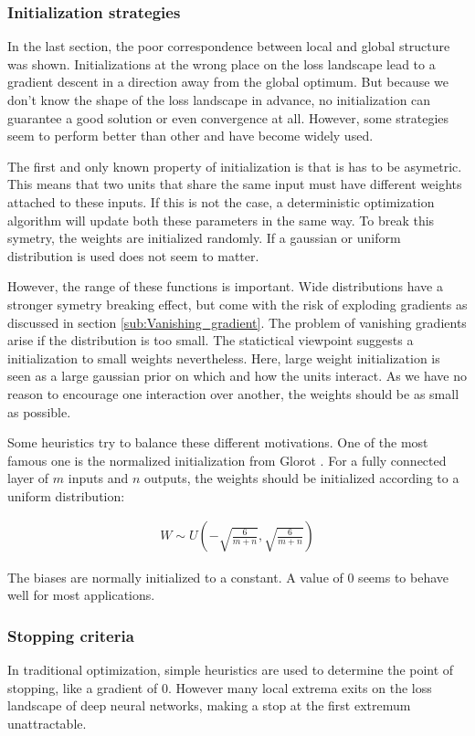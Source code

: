 \subsubsection{Initialization strategies}\label{sub:Initialization_strategies}
In the last section, the poor correspondence between local and global structure
was shown. Initializations at the wrong place on the loss landscape lead to a
gradient descent in a direction away from the global optimum. But because we
don't know the shape of the loss landscape in advance, no initialization can
guarantee a good solution or even convergence at all. However, some strategies
seem to perform better than other and have become widely used.

The first and only known property of initialization is that is has to be
asymetric. This means that two units that share the same input must have
different weights attached to these inputs. If this is not the case, a
deterministic optimization algorithm will update both these parameters in the
same way. To break this symetry, the weights are initialized randomly. If a
gaussian or uniform distribution is used does not seem to matter.

However, the range of these functions is important. Wide distributions have a
stronger symetry breaking effect, but come with the risk of exploding gradients
as discussed in section \ref{sub:Vanishing_gradient}. The problem of vanishing
gradients arise if the distribution is too small. The statictical viewpoint
suggests a initialization to small weights nevertheless. Here, large weight
initialization is seen as a large gaussian prior on which and how the units
interact. As we have no reason to encourage one interaction over another, the
weights should be as small as possible. 

Some heuristics try to balance these different motivations. One of the most
famous one is the normalized initialization from Glorot
\cite{glorot2010understanding}. For a fully connected layer of $m$ inputs and
$n$ outputs, the weights should be initialized according to a uniform
distribution:

\begin{align}
    W \sim U(-\sqrt{\frac{6}{m+n}}, \sqrt{\frac{6}{m+n}})
\end{align}

The biases are normally initialized to a constant. A value of 0 seems to behave
well for most applications.




\subsubsection{Stopping criteria}\label{sub:Stopping_criteria}
In traditional optimization, simple heuristics are used to determine the point
of stopping, like a gradient of 0. However many local extrema exits on the loss
landscape of deep neural networks, making a stop at the first extremum
unattractable.

